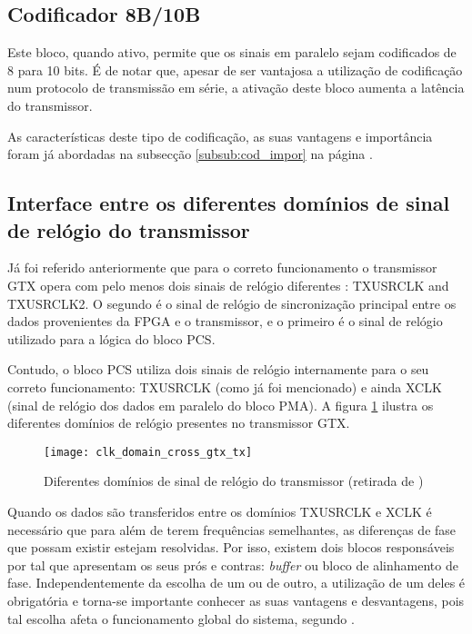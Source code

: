 \subsection{Codificador 8B/10B}

Este bloco, quando ativo, permite que os sinais em paralelo sejam codificados de 8 para 10 bits. É de notar que, apesar de ser vantajosa a utilização de codificação num protocolo de transmissão em série, a ativação deste bloco aumenta a latência do transmissor.

As características deste tipo de codificação, as suas vantagens e importância foram já abordadas na subsecção \ref{subsub:cod_impor} na página \pageref{subsub:cod_impor}.


\subsection{Interface entre os diferentes domínios de sinal de relógio do transmissor} \label{subsub:tx_buffer}

Já foi referido anteriormente que para o correto funcionamento o transmissor GTX opera com pelo menos dois sinais de relógio diferentes : TXUSRCLK and TXUSRCLK2. O segundo é o sinal de relógio de sincronização principal entre os dados provenientes da FPGA e o transmissor, e o primeiro é o sinal de relógio utilizado para a lógica do bloco PCS.

Contudo, o bloco PCS utiliza dois sinais de relógio internamente para o seu correto funcionamento: TXUSRCLK (como já foi mencionado) e ainda XCLK (sinal de relógio dos dados em paralelo do bloco PMA). A figura \ref{fig:clk_domains_tx} ilustra os diferentes domínios de relógio presentes no transmissor GTX.

\begin{figure}[h!]
	\begin{center}
		\leavevmode
		\texttt{[image: clk\_domain\_cross\_gtx\_tx]}
		\caption[Diferentes domínios de sinal de relógio do transmissor]{Diferentes domínios de sinal de relógio do transmissor (retirada de \cite{R011})}
		\label{fig:clk_domains_tx}
	\end{center}
\end{figure}

Quando os dados são transferidos entre os domínios TXUSRCLK e XCLK é necessário que para além de terem frequências semelhantes, as diferenças de fase que possam existir estejam resolvidas. Por isso, existem dois blocos responsáveis por tal que apresentam os seus prós e contras: \textit{buffer} ou bloco de alinhamento de fase. Independentemente da escolha de um ou de outro, a utilização de um deles é obrigatória e torna-se importante conhecer as suas vantagens e desvantagens, pois tal escolha afeta o funcionamento global do sistema, segundo \cite{R011}.

